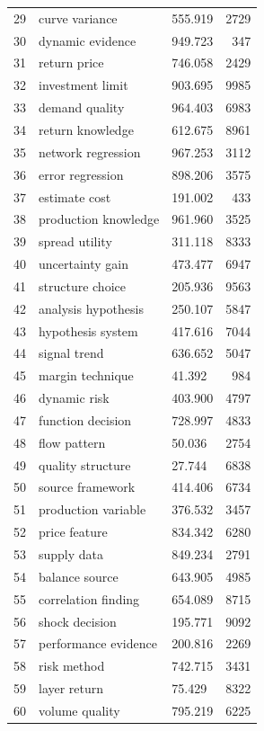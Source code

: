 \documentclass[11pt]{report}
\begin{document}
\begin{longtable}{rllr}
29 & curve variance & 555.919 & 2729 \\
30 & dynamic evidence & 949.723 & 347 \\
31 & return price & 746.058 & 2429 \\
32 & investment limit & 903.695 & 9985 \\
33 & demand quality & 964.403 & 6983 \\
34 & return knowledge & 612.675 & 8961 \\
35 & network regression & 967.253 & 3112 \\
36 & error regression & 898.206 & 3575 \\
37 & estimate cost & 191.002 & 433 \\
38 & production knowledge & 961.960 & 3525 \\
39 & spread utility & 311.118 & 8333 \\
40 & uncertainty gain & 473.477 & 6947 \\
41 & structure choice & 205.936 & 9563 \\
42 & analysis hypothesis & 250.107 & 5847 \\
43 & hypothesis system & 417.616 & 7044 \\
44 & signal trend & 636.652 & 5047 \\
45 & margin technique & 41.392 & 984 \\
46 & dynamic risk & 403.900 & 4797 \\
47 & function decision & 728.997 & 4833 \\
48 & flow pattern & 50.036 & 2754 \\
49 & quality structure & 27.744 & 6838 \\
50 & source framework & 414.406 & 6734 \\
51 & production variable & 376.532 & 3457 \\
52 & price feature & 834.342 & 6280 \\
53 & supply data & 849.234 & 2791 \\
54 & balance source & 643.905 & 4985 \\
55 & correlation finding & 654.089 & 8715 \\
56 & shock decision & 195.771 & 9092 \\
57 & performance evidence & 200.816 & 2269 \\
58 & risk method & 742.715 & 3431 \\
59 & layer return & 75.429 & 8322 \\
60 & volume quality & 795.219 & 6225 \\
\end{longtable}
\end{document}
